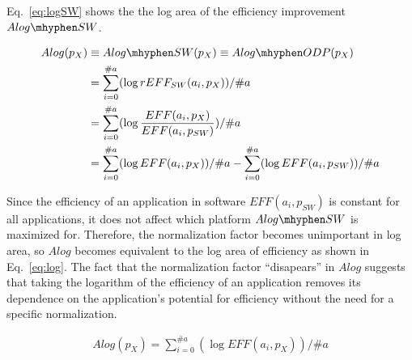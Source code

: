 Eq.~\eqref{eq:logSW} shows the the log area of the efficiency improvement $Alog\mhyphen SW$. 

\begingroup\makeatletter{}\check@mathfonts
\vspace{-8pt}
\begin{equation}
\begin{split}
	Alog(p_{X}) &\equiv Alog\mhyphen SW(p_{X}) \equiv Alog\mhyphen ODP(p_{X}) \\
	&= \sum_{i=0}^{\#a} ( \log rEFF_{SW}(a_{i}, p_{X}) ) / \#a  \\
	&= \sum_{i=0}^{\#a} ( \log \frac{EFF(a_{i}, p_{X})}{EFF(a_{i}, p_{SW})}) / \#a \\
	&= \sum_{i=0}^{\#a} ( \log EFF(a_{i}, p_{X}) ) / \#a - \sum_{i=0}^{\#a} ( \log EFF(a_i, p_{SW}) ) / \#a
\label{eq:logDetial}
\end{split}
\end{equation}
\endgroup

Since the efficiency of an application in software $EFF(a_i, p_{SW})$ is constant for all applications, it does not affect which platform $Alog\mhyphen SW$ is maximized for. Therefore, the normalization factor becomes unimportant in log area, so $Alog$ becomes equivalent to the log area of efficiency as shown in Eq.~\eqref{eq:log}. The fact that the normalization factor ``disapears'' in $Alog$ suggests that taking the logarithm of the efficiency of an application removes its dependence on the application's potential for efficiency without the need for a specific normalization.


\begingroup\makeatletter{}\check@mathfonts
\vspace{-8pt}
\begin{equation}
\begin{split}
	Alog(p_{X}) = \sum_{i=0}^{\#a} ( \log EFF(a_{i}, p_{X}) ) / \#a	
\end{split}
\label{eq:log}
\end{equation}
\endgroup